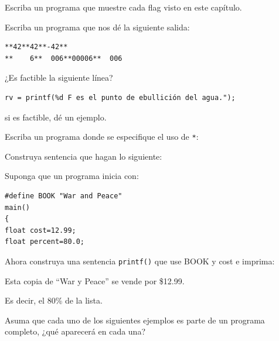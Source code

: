 \documentclass[spanish,addpoints,answers,a4paper]{exam}
\begin{document}
\begin{questions}

\question Escriba un programa que muestre cada flag visto en este capítulo.

\question Escriba un programa que nos dé la siguiente salida:

\begin{verbatim}
**42**42**-42**
**    6**  006**00006**  006
\end{verbatim}

\question ¿Es factible la siguiente línea?

\begin{verbatim}
rv = printf(%d F es el punto de ebullición del agua.");
\end{verbatim}

si es factible, dé un ejemplo.

\question Escriba un programa donde se especifique el uso de \texttt{*}:

\question Construya sentencia que hagan lo siguiente:

\question Suponga que un programa inicia con:

\begin{verbatim}
#define BOOK "War and Peace"
main()
{
float cost=12.99;
float percent=80.0;
\end{verbatim}

Ahora construya una sentencia \texttt{printf()} que use BOOK y cost e imprima:

\begin{flushleft}
Esta copia de ``War y Peace'' se vende por \$12.99.

Es decir, el 80\% de la lista.
\end{flushleft}

\question Asuma que cada uno de los siguientes ejemplos es parte de un programa completo, ¿qué aparecerá en cada una?


\end{questions}
\end{document}
